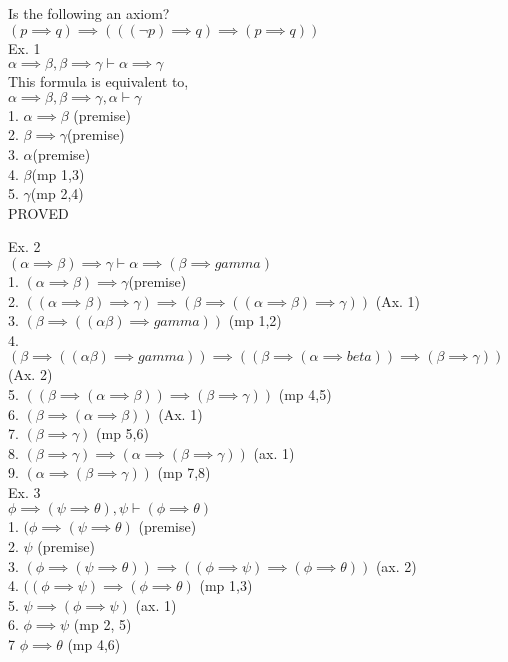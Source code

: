 \documentclass[12pt,oneside,notitlepage]{book}
\theoremstyle{definition}
\begin{document}
Is the following an axiom? \\
$(p \implies q) \implies (((\neg p) \implies q) \implies (p \implies q))$ \\

Ex. 1 \\
${ \alpha \implies \beta , \beta \implies \gamma} \vdash \alpha \implies \gamma$ \\
This formula is equivalent to, \\
${\alpha \implies \beta, \beta \implies \gamma, \alpha} \vdash \gamma$ \\
1. $\alpha \implies \beta$ (premise) \\
2. $\beta \implies \gamma $(premise) \\
3. $\alpha $(premise) \\
4. $\beta $(mp 1,3) \\
5. $\gamma $(mp 2,4) \\
PROVED

Ex. 2 \\
${ (\alpha \implies \beta) \implies \gamma} \vdash \alpha \implies (\beta \implies gamma)$ \\
1. $(\alpha \implies \beta) \implies \gamma $(premise) \\
2. $((\alpha \implies \beta) \implies \gamma) \implies (\beta \implies ((\alpha \implies \beta) \implies \gamma))$ (Ax. 1) \\
3. $(\beta \implies (( \alpha \beta) \implies gamma))$ (mp 1,2) \\
4. $(\beta \implies (( \alpha \beta) \implies gamma)) \implies (( \beta \implies (\alpha \implies beta)) \implies (\beta \implies \gamma))$ (Ax. 2) \\
5. $((\beta \implies (\alpha \implies \beta)) \implies (\beta \implies \gamma))$ (mp 4,5) \\
6. $(\beta \implies (\alpha \implies \beta))$ (Ax. 1) \\
7. $(\beta \implies \gamma)$ (mp 5,6) \\
8. $(\beta \implies \gamma) \implies (\alpha \implies (\beta \implies \gamma))$ (ax. 1) \\
9. $(\alpha \implies (\beta \implies \gamma))$ (mp 7,8) \\

Ex. 3 \\
${ \phi \implies (\psi \implies \theta), \psi} \vdash (\phi \implies \theta)$ \\
1. $(\phi \implies (\psi \implies \theta)$ (premise) \\
2. $\psi$ (premise) \\
3. $(\phi \implies (\psi \implies \theta) ) \implies ((\phi \implies \psi) \implies (\phi \implies \theta))$ (ax. 2) \\
4. $((\phi \implies \psi) \implies (\phi \implies \theta)$ (mp 1,3) \\
5. $\psi \implies (\phi \implies \psi)$ (ax. 1) \\
6. $\phi \implies \psi$ (mp 2, 5) \\
7 $\phi \implies \theta$ (mp 4,6) \\
\end{document}
